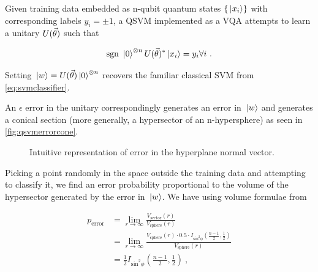 
Given training data embedded as n-qubit quantum states \(\{\ket*{x_i}\}\) with
corresponding labels \({y_i = \pm 1}\), a QSVM implemented as a VQA attempts to learn a
unitary \(U(\vec{\theta})\) such that

\begin{equation}
    \text{sgn }{\ket*{0}^{\otimes n}U(\vec{\theta})^*\ket*{x_i}} = y_i \forall i~.
\end{equation}

Setting \(\ket*{w} = U(\vec{\theta})\ket*{0}^{\otimes n}\) recovers the
familiar classical SVM from \autoref{eq:svmclassifier}.

An \(\epsilon\) error in the unitary correspondingly generates an error in
\(\ket*{w}\) and generates a conical section (more generally, a hypersector of
an n-hypersphere) as seen in \autoref{fig:qsvmerrorcone}.

\begin{figure}[!ht]
    \centering
      \caption{Intuitive representation of error in the hyperplane normal vector.}
      \label{fig:svmerrorcone}
\end{figure}

Picking a point randomly in the space outside the training data and attempting
to classify it, we find an error probability proportional to the volume of the
hypersector generated by the error in \(\ket*{w}\). We have using volume
formulae from \cite{li2011concise}

\begin{align}
        p_{\text{error}} &= \lim_{r\to \infty}\frac{V_{\text{sector}}(r)}{V_{\text{sphere}}(r)} \nonumber\\
            &= \lim_{r\to \infty}\frac{V_{\text{sphere}}(r)\cdot 0.5\cdot I_{\text{sin}^2\phi}(\frac{n-1}{2}, \frac{1}{2})}{V_{\text{sphere}}(r)} \nonumber\\
            &= \frac{1}{2} I_{\text{sin}^2\phi}(\frac{n-1}{2}, \frac{1}{2})~,
\end{align}

